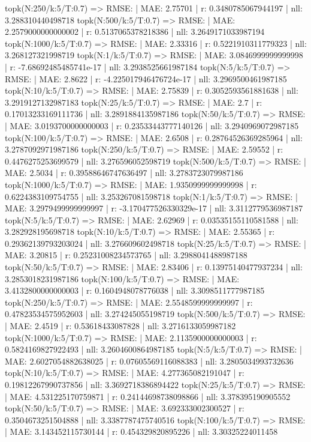 topk(N:250/k:5/T:0.7) => RMSE: | MAE: 2.75701 | r: 0.3480785067944197 | nll: 3.288310440498718
topk(N:500/k:5/T:0.7) => RMSE: | MAE: 2.2579000000000002 | r: 0.5137065378218386 | nll: 3.2649171033987194
topk(N:1000/k:5/T:0.7) => RMSE: | MAE: 2.33316 | r: 0.5221910311779323 | nll: 3.268127321998719
topk(N:1/k:5/T:0.7) => RMSE: | MAE: 3.0846999999999998 | r: -7.68692485485741e-17 | nll: 3.2938525661987184
topk(N:5/k:5/T:0.7) => RMSE: | MAE: 2.8622 | r: -4.225017946476724e-17 | nll: 3.2969500461987185
topk(N:10/k:5/T:0.7) => RMSE: | MAE: 2.75839 | r: 0.3052593561881638 | nll: 3.2919127132987183
topk(N:25/k:5/T:0.7) => RMSE: | MAE: 2.7 | r: 0.17013233169111736 | nll: 3.2891884135987186
topk(N:50/k:5/T:0.7) => RMSE: | MAE: 3.0193700000000003 | r: 0.23533443777140126 | nll: 3.2940969072987185
topk(N:100/k:5/T:0.7) => RMSE: | MAE: 2.6508 | r: 0.28764526369285964 | nll: 3.2787092971987186
topk(N:250/k:5/T:0.7) => RMSE: | MAE: 2.59552 | r: 0.4476275253699579 | nll: 3.276596052598719
topk(N:500/k:5/T:0.7) => RMSE: | MAE: 2.5034 | r: 0.39588646747636497 | nll: 3.2783723079987186
topk(N:1000/k:5/T:0.7) => RMSE: | MAE: 1.9350999999999998 | r: 0.6224383109754755 | nll: 3.253267081598718
topk(N:1/k:5/T:0.7) => RMSE: | MAE: 3.2979499999999997 | r: -3.170477526330329e-17 | nll: 3.3112779536987187
topk(N:5/k:5/T:0.7) => RMSE: | MAE: 2.62969 | r: 0.03535155110581588 | nll: 3.282928195698718
topk(N:10/k:5/T:0.7) => RMSE: | MAE: 2.55365 | r: 0.29362139793203024 | nll: 3.276609602498718
topk(N:25/k:5/T:0.7) => RMSE: | MAE: 3.20815 | r: 0.25231008234573765 | nll: 3.2988041488987188
topk(N:50/k:5/T:0.7) => RMSE: | MAE: 2.83406 | r: 0.13975140477937234 | nll: 3.2853018231987186
topk(N:100/k:5/T:0.7) => RMSE: | MAE: 3.4132800000000003 | r: 0.1604948078776038 | nll: 3.3098511777987185
topk(N:250/k:5/T:0.7) => RMSE: | MAE: 2.5548599999999997 | r: 0.47823534575952603 | nll: 3.274245055198719
topk(N:500/k:5/T:0.7) => RMSE: | MAE: 2.4519 | r: 0.53618433087828 | nll: 3.2716133059987182
topk(N:1000/k:5/T:0.7) => RMSE: | MAE: 2.1135900000000003 | r: 0.5824169827922493 | nll: 3.2604600864987185
topk(N:5/k:5/T:0.7) => RMSE: | MAE: 2.6027054882638025 | r: 0.07605569116088383 | nll: 3.2805034993732636
topk(N:10/k:5/T:0.7) => RMSE: | MAE: 4.277365082191047 | r: 0.19812267990737856 | nll: 3.3692718386894422
topk(N:25/k:5/T:0.7) => RMSE: | MAE: 4.531225170759871 | r: 0.24144698738098866 | nll: 3.378395190905552
topk(N:50/k:5/T:0.7) => RMSE: | MAE: 3.692333002300527 | r: 0.3504673251504888 | nll: 3.3387787475740516
topk(N:100/k:5/T:0.7) => RMSE: | MAE: 3.143452115730144 | r: 0.454329820895226 | nll: 3.30325224011458
